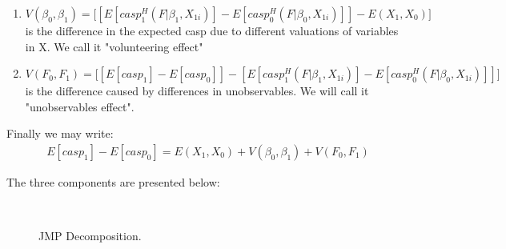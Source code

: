 \documentclass[10pt, letterpaper]{article}
\begin{document}
\begin{spacing}{1.4}
\begin{enumerate}
\item $ V(\beta_{0},\beta_{1}) =\bigg[ [E[casp^{H}_{1}(F|\beta_{1},X_{1i})]- E[casp^{H}_{0}(F|\beta_{0},X_{1i})]] -E(X_{1},X_{0})\bigg]$ is the difference in the expected casp due to different valuations of variables in X. We call it "volunteering effect"

\item $ V(F_{0},F_{1}) =\bigg[ [E[casp_{1}]-E[casp_{0}]] - [E[casp^{H}_{1}(F|\beta_{1},X_{1i})]- E[casp^{H}_{0}(F|\beta_{0},X_{1i})]] \bigg] $ is the difference caused by differences in unobservables. We will call it "unobservables effect".

\end{enumerate}

Finally  we may write:
  \begin{eqnarray} 
	E[casp_{1}]-E[casp_{0}]= E(X_{1},X_{0}) +  V(\beta_{0},\beta_{1}) +  V(F_{0},F_{1})
 \end{eqnarray}


The three components are presented below:


\begin{figure}[H]
\centering
\caption{JMP Decomposition.} 
\label{fig:pooling1}
\begin{minipage}{1\linewidth}
\quad
{}~\\


\end{minipage}
\end{figure}
\end{spacing}
\end{document}
